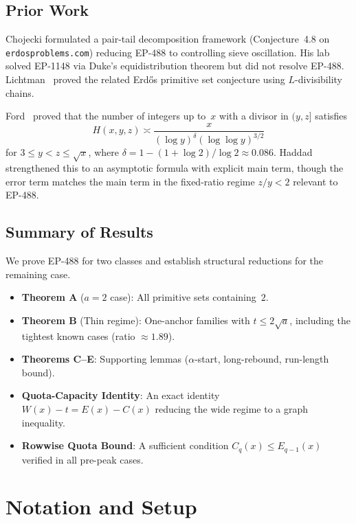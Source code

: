\documentclass[11pt,a4paper]{article}
\theoremstyle{definition}
\begin{document}
\subsection{Prior Work}

Chojecki formulated a pair-tail decomposition framework (Conjecture~4.8 
on \texttt{erdosproblems.com}) reducing EP-488 to controlling sieve 
oscillation. His lab solved EP-1148 via Duke's equidistribution theorem 
but did not resolve EP-488. Lichtman~\cite{Li22} proved the related 
Erd\H{o}s primitive set conjecture using $L$-divisibility chains.

Ford~\cite{Fo08} proved that the number of integers up to~$x$ with a 
divisor in $(y,z]$ satisfies
\[
H(x,y,z) \asymp \frac{x}{(\log y)^{\delta}(\log\log y)^{3/2}}
\]
for $3 \leq y < z \leq \sqrt{x}$, where 
$\delta = 1 - (1+\log 2)/\log 2 \approx 0.086$. 
Haddad~\cite{Ha25} strengthened this to an asymptotic formula with 
explicit main term, though the error term matches the main term in the 
fixed-ratio regime $z/y < 2$ relevant to EP-488.

\subsection{Summary of Results}

We prove EP-488 for two classes and establish structural reductions for 
the remaining case.

\begin{itemize}
\item \textbf{Theorem A} ($a=2$ case): All primitive sets containing~$2$.
\item \textbf{Theorem B} (Thin regime): One-anchor families with 
$t \leq 2\sqrt{a}$, including the tightest known cases (ratio $\approx 1.89$).
\item \textbf{Theorems C--E}: Supporting lemmas ($\alpha$-start, 
long-rebound, run-length bound).
\item \textbf{Quota-Capacity Identity}: An exact identity 
$W(x) - t = E(x) - C(x)$ reducing the wide regime to a graph inequality.
\item \textbf{Rowwise Quota Bound}: A sufficient condition 
$C_q(x) \leq E_{q-1}(x)$ verified in all pre-peak cases.
\end{itemize}

\section{Notation and Setup}
\end{document}
